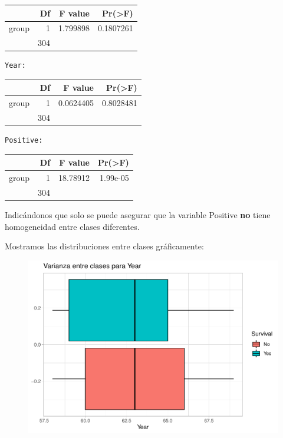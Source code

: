 \begin{tabular}{l|r|r|r}
\hline
  & Df & F value & Pr(>F)\\
\hline
group & 1 & 1.799898 & 0.1807261\\
\hline
 & 304 &  & \\
\hline
\end{tabular}

\begin{verbatim}
Year:
\end{verbatim}

\begin{tabular}{l|r|r|r}
\hline
  & Df & F value & Pr(>F)\\
\hline
group & 1 & 0.0624405 & 0.8028481\\
\hline
 & 304 &  & \\
\hline
\end{tabular}

\begin{verbatim}
Positive:
\end{verbatim}

\begin{tabular}{l|r|r|r}
\hline
  & Df & F value & Pr(>F)\\
\hline
group & 1 & 18.78912 & 1.99e-05\\
\hline
 & 304 &  & \\
\hline
\end{tabular}

Indicándonos que solo se puede asegurar que la variable Positive \textbf{no} tiene homogeneidad entre clases diferentes.

\vspace{\baselineskip}

Mostramos las distribuciones entre clases gráficamente:

\begin{figure}[H]\center\includegraphics[width=.8\linewidth]{img/Clasificacion_files/figure-latex/unnamed-chunk-17-1}\caption{}\end{figure}

